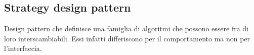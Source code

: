 \subsection*{Strategy design pattern}
Design pattern che definisce una famiglia di algoritmi che possono essere fra di loro interscambiabili. Essi infatti differiscono per il comportamento ma non per l'interfaccia. 

